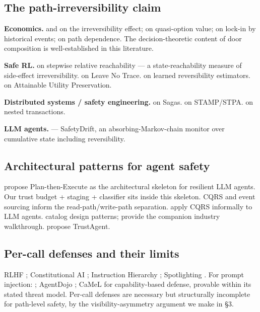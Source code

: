 \documentclass[11pt]{article}
\begin{document}
\subsection{The path-irreversibility claim}

\textbf{Economics.} \citet{arrow1974} and \citet{henry1974} on the irreversibility effect; \citet{hanemann1989} on quasi-option value; \citet{arthur1989} on lock-in by historical events; \citet{david1985} on path dependence. The decision-theoretic content of door composition is well-established in this literature.

\textbf{Safe RL.} \citet{krakovna2018} on stepwise relative reachability --- a state-reachability measure of side-effect irreversibility. \citet{eysenbach2018} on Leave No Trace. \citet{grinsztajn2021} on learned reversibility estimators. \citet{turner2020} on Attainable Utility Preservation.

\textbf{Distributed systems / safety engineering.} \citet{garcia1987sagas} on Sagas. \citet{leveson2011} on STAMP/STPA. \citet{lynch1988} on nested transactions.

\textbf{LLM agents.} \citet{dhodapkar2026safetydrift} --- SafetyDrift, an absorbing-Markov-chain monitor over cumulative state including reversibility.

\subsection{Architectural patterns for agent safety}

\citet{delrosario2025planex} propose Plan-then-Execute as the architectural skeleton for resilient LLM agents. Our trust budget + staging + classifier sits inside this skeleton. CQRS \citep{young2010cqrs} and event sourcing inform the read-path/write-path separation. \citet{camarques2024cqrs} apply CQRS informally to LLM agents. \citet{beurerkellner2025patterns} catalog design patterns; \citet{reversec2025patterns} provide the companion industry walkthrough. \citet{hua2024trustagent} propose TrustAgent.

\subsection{Per-call defenses and their limits}

RLHF \citep{ouyang2022rlhf}; Constitutional AI \citep{bai2022cai}; Instruction Hierarchy \citep{wallace2024hierarchy}; Spotlighting \citep{hines2024spotlighting}. For prompt injection: \citet{greshake2023}; AgentDojo \citep{debenedetti2024agentdojo}; CaMeL \citep{debenedetti2025camel} for capability-based defense, provable within its stated threat model. Per-call defenses are necessary but structurally incomplete for path-level safety, by the visibility-asymmetry argument we make in §3.
\end{document}
